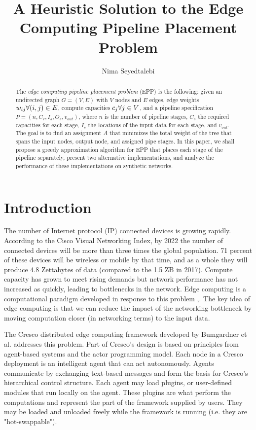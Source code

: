 \documentclass{article}
\author{Nima Seyedtalebi}
\title{A Heuristic Solution to the Edge Computing Pipeline Placement Problem}
\newcommand{\forallv}[1]{\ensuremath{\forall #1 \in V}}
\newcommand{\foralle}[2]{\ensuremath{\forall (#1,#2) \in E }}
\begin{document}
	\maketitle
	\begin{abstract}
		The \textit{edge computing pipeline placement problem} (EPP) is the following: given an undirected graph $G=(V,E)$ with $V$ nodes and $E$ edges, edge weights $w_{ij} \space \foralle{i}{j}$, compute capacities $c_{j} \space \forallv{j}$, and a pipeline specification $P = (n,C_{r},I_{s},O_{s},v_{out})$, where  $n$ is the number of pipeline stages, $C_{s}$ the required capacities for each stage, $I_{s}$ the locations of the input data for each stage, and $v_{out}$. The goal is to find an assignment $A$ that minimizes the total weight of the tree that spans the input nodes, output node, and assigned pipe stages. In this paper, we shall propose a greedy approximation algorithm for EPP that places each stage of the pipeline separately, present two alternative implementations, and analyze the performance of these implementations on synthetic networks.
	\end{abstract}
	
	\section{Introduction}
	The number of Internet protocol (IP) connected devices is growing rapidly. According to the Cisco Visual Networking Index, by 2022 the number of connected devices will be more than three times the global population. 71 percent of these devices will be wireless or mobile by that time, and as a whole they will produce 4.8 Zettabytes of data (compared to the 1.5 ZB in 2017).\cite{ciscoVNI} Compute capacity has grown to meet rising demands but network performance has not increased as quickly, leading to bottlenecks in the network. Edge computing is a computational paradigm developed in response to this problem \cite{edgeEmerge},\cite{edgePromise}. The key idea of edge computing is that we can reduce the impact of the networking bottleneck by moving computation closer (in networking terms) to the input data.
	
	The Cresco distributed edge computing framework developed by Bumgardner et al.\cite{bumgardner2016cresco} addresses this problem. Part of Cresco's design is based on principles from agent-based systems and the actor programming model. Each node in a Cresco deployment is an intelligent agent that can act autonomously. Agents communicate by exchanging text-based messages and form the basis for Cresco's hierarchical control structure. Each agent may load plugins, or user-defined modules that run locally on the agent. These plugins are what perform the computations and represent the part of the framework supplied by users. They may be loaded and unloaded freely while the framework is running (i.e. they are "hot-swappable").
	
\end{document}
